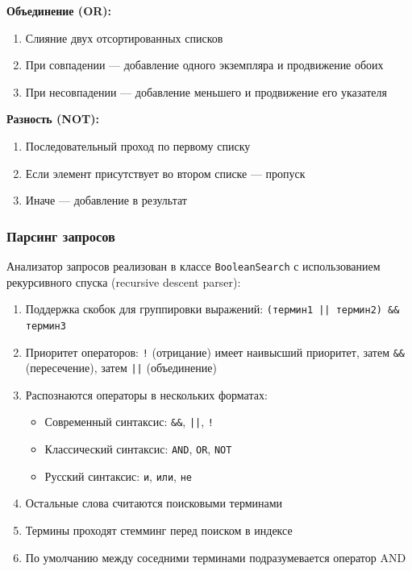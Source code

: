 \textbf{Объединение (OR):}
\begin{enumerate}
    \item Слияние двух отсортированных списков
    \item При совпадении --- добавление одного экземпляра и продвижение обоих
    \item При несовпадении --- добавление меньшего и продвижение его указателя
\end{enumerate}

\textbf{Разность (NOT):}
\begin{enumerate}
    \item Последовательный проход по первому списку
    \item Если элемент присутствует во втором списке --- пропуск
    \item Иначе --- добавление в результат
\end{enumerate}

\subsubsection{Парсинг запросов}

Анализатор запросов реализован в классе \texttt{BooleanSearch} с использованием рекурсивного спуска (recursive descent parser):

\begin{enumerate}
    \item Поддержка скобок для группировки выражений: \texttt{(термин1 || термин2) \&\& термин3}
    \item Приоритет операторов: \texttt{!} (отрицание) имеет наивысший приоритет, затем \texttt{\&\&} (пересечение), затем \texttt{||} (объединение)
    \item Распознаются операторы в нескольких форматах:
    \begin{itemize}
        \item Современный синтаксис: \texttt{\&\&}, \texttt{||}, \texttt{!}
        \item Классический синтаксис: \texttt{AND}, \texttt{OR}, \texttt{NOT}
        \item Русский синтаксис: \texttt{и}, \texttt{или}, \texttt{не}
    \end{itemize}
    \item Остальные слова считаются поисковыми терминами
    \item Термины проходят стемминг перед поиском в индексе
    \item По умолчанию между соседними терминами подразумевается оператор AND
\end{enumerate}

